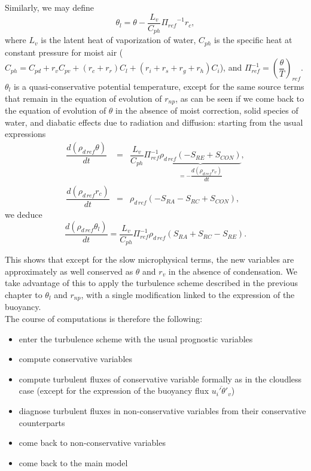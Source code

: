 Similarly, we may define
\begin{equation} \label{defthetal}
\theta_l = \theta - {\dfrac{L_v}{C_{ph}}
{\Pi_{ref}}^{-1}r_c},
\end{equation}
where $L_v$ is the
latent heat of vaporization of water, $C_{ph}$ is the specific heat at
constant pressure for moist air ($C_{ph} = C_{pd} + r_v C_{pv} +
(r_c+r_r) C_l + (r_i+r_s+r_g+r_h) C_i$),
and $\Pi_{ref}^{-1} = \left(\dfrac{\theta}{T}\right)_{ref}$.  $\theta_l$ is a
quasi-conservative potential temperature, except for the same source terms
that remain in the equation of evolution of $r_{np}$, as can be seen if
we come back to the equation of evolution of $\theta$ in the absence
of moist correction, solid species of water, and diabatic effects due to
radiation and diffusion:  starting from the usual expressions
\begin{eqnarray}
\dfrac{d(\rho_{d\,ref} \theta)}{dt}&=&
{\dfrac{L_v}{C_{ph}}{\Pi_{ref}^{-1}}
\underbrace{\rho_{d\,ref} (-S_{RE}+S_{CON})}_{ =
-\dfrac{d(\rho_{d\,ref} r_{v})}{dt}}}, \\
\dfrac{d(\rho_{d\,ref} r_{c})}{dt}&=&\rho_{d\,ref}
(-S_{RA}-S_{RC}+S_{CON}),
\end{eqnarray}
we deduce
\begin{equation}\label{eqn:thetalev}
\dfrac{d(\rho_{d\,ref} \theta_l)}{dt} = \dfrac{L_v}{C_{ph}} {\Pi_{ref}^{-1}}
\rho_{d\,ref} (S_{RA}+S_{RC}-S_{RE}).
\end{equation}

This shows that except for the slow microphysical terms, the new variables
are approximately as well conserved as $\theta$ and $r_v$ in the absence of
condensation. We take advantage of this to apply the turbulence scheme
described in the previous chapter to $\theta_l$ and $r_{np}$, with a
single modification  linked to the expression of the buoyancy.\\

The course of computations is therefore the following:
\begin{itemize}
\item enter the turbulence scheme with the usual prognostic variables
\item compute conservative variables
\item compute turbulent fluxes of conservative variable formally
as in the cloudless case (except for the
expression of the buoyancy flux $\overline{u_i' \theta'_v}$)
\item diagnose turbulent fluxes in non-conservative variables from
their conservative counterparts
\item come back to non-conservative variables
\item come back to the main model
\end{itemize}

